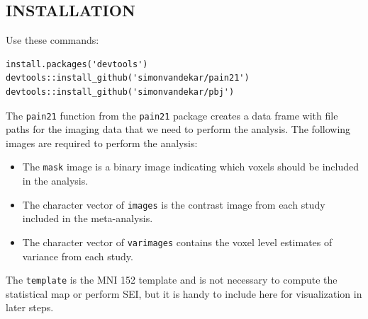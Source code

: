 \documentclass[]{article}
\newenvironment{Shaded}{\begin{snugshade}}{\end{snugshade}}
\newcommand{\KeywordTok}[1]{\textcolor[rgb]{0.13,0.29,0.53}{\textbf{#1}}}
\newcommand{\DecValTok}[1]{\textcolor[rgb]{0.00,0.00,0.81}{#1}}
\newcommand{\StringTok}[1]{\textcolor[rgb]{0.31,0.60,0.02}{#1}}
\newcommand{\CommentTok}[1]{\textcolor[rgb]{0.56,0.35,0.01}{\textit{#1}}}
\newcommand{\OperatorTok}[1]{\textcolor[rgb]{0.81,0.36,0.00}{\textbf{#1}}}
\newcommand{\NormalTok}[1]{#1}
\providecommand{\tightlist}{%
  \setlength{\itemsep}{0pt}\setlength{\parskip}{0pt}}
\begin{document}
\subsection{INSTALLATION}\label{installation}

Use these commands:

\begin{verbatim}
install.packages('devtools')
devtools::install_github('simonvandekar/pain21')
devtools::install_github('simonvandekar/pbj')
\end{verbatim}

The \texttt{pain21} function from the \texttt{pain21} package creates a
data frame with file paths for the imaging data that we need to perform
the analysis. The following images are required to perform the analysis:

\begin{itemize}
\tightlist
\item
  The \texttt{mask} image is a binary image indicating which voxels
  should be included in the analysis.
\item
  The character vector of \texttt{images} is the contrast image from
  each study included in the meta-analysis.
\item
  The character vector of \texttt{varimages} contains the voxel level
  estimates of variance from each study.
\end{itemize}

The \texttt{template} is the MNI 152 template and is not necessary to
compute the statistical map or perform SEI, but it is handy to include
here for visualization in later steps.

\begin{Shaded}
\end{Shaded}
\end{document}
